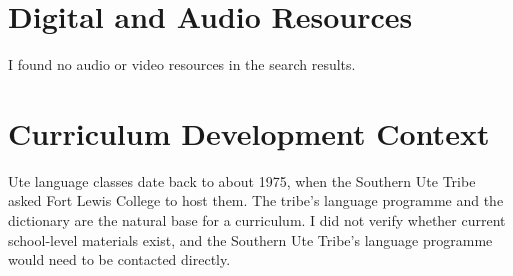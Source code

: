 \documentclass[12pt]{article}
\begin{document}
\section{Digital and Audio Resources}
I found no audio or video resources in the search results.
\section{Curriculum Development Context}
Ute language classes date back to about 1975, when the Southern Ute Tribe asked Fort Lewis College to host them. The tribe's language programme and the dictionary are the natural base for a curriculum. I did not verify whether current school-level materials exist, and the Southern Ute Tribe's language programme would need to be contacted directly.
\end{document}
